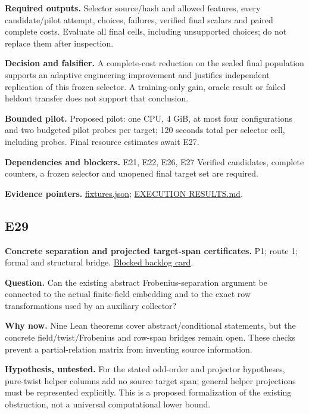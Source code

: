 \documentclass[
  10pt,
]{article}
\begin{document}
\textbf{Required outputs.} Selector source/hash and allowed features,
every candidate/pilot attempt, choices, failures, verified final scalars
and paired complete costs. Evaluate all final cells, including
unsupported choices; do not replace them after inspection.

\textbf{Decision and falsifier.} A complete-cost reduction on the sealed
final population supports an adaptive engineering improvement and
justifies independent replication of this frozen selector. A
training-only gain, oracle result or failed heldout transfer does not
support that conclusion.

\textbf{Bounded pilot.} Proposed pilot: one CPU, 4 GiB, at most four
configurations and two budgeted pilot probes per target; 120 seconds
total per selector cell, including probes. Final resource estimates
await E27.

\textbf{Dependencies and blockers.} E21, E22, E26, E27 Verified
candidates, complete counters, a frozen selector and unopened final
target set are required.

\textbf{Evidence pointers.}
\href{../../../research/twist_routes_1_3_20261021/execution-v1/fixtures.json}{fixtures.json};
\href{../../../research/twist_routes_1_3_20261021/reports/EXECUTION_RESULTS.md}{EXECUTION
RESULTS.md}.

\subsection{E29}\label{e29}

\textbf{Concrete separation and projected target-span certificates.} P1;
route 1; formal and structural bridge.
\href{../../../backlog/XP-20261022-twist-projection-span-certificate/README.md}{Blocked
backlog card}.

\textbf{Question.} Can the existing abstract Frobenius-separation
argument be connected to the actual finite-field embedding and to the
exact row transformations used by an auxiliary collector?

\textbf{Why now.} Nine Lean theorems cover abstract/conditional
statements, but the concrete field/twist/Frobenius and row-span bridges
remain open. These checks prevent a partial-relation matrix from
inventing source information.

\textbf{Hypothesis, untested.} For the stated odd-order and projector
hypotheses, pure-twist helper columns add no source target span; general
helper projections must be represented explicitly. This is a proposed
formalization of the existing obstruction, not a universal computational
lower bound.
\end{document}
